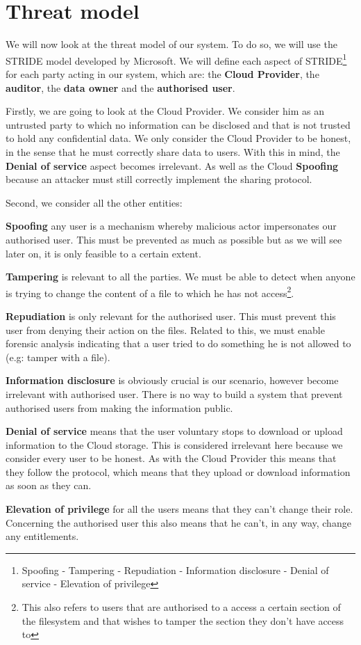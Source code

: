 \documentclass[../main.tex]{subfiles}
\begin{document}
\section{Threat model}
\label{section:problem:threat_model}

\par We will now look at the threat model of our system. To do so, we will use the STRIDE model developed by Microsoft. We will define each aspect of STRIDE\footnote{Spoofing - Tampering - Repudiation - Information disclosure - Denial of service - Elevation of privilege} for each party acting in our system, which are: the \textbf{Cloud Provider}, the \textbf{auditor}, the \textbf{data owner} and the \textbf{authorised user}.\\

\par Firstly, we are going to look at the Cloud Provider. We consider him as an untrusted party to which no information can be disclosed and that is not trusted to hold any confidential data. We only consider the Cloud Provider to be honest, in the sense that he must correctly share data to users. With this in mind, the \textbf{Denial of service} aspect becomes irrelevant. As well as the Cloud \textbf{Spoofing} because an attacker must still correctly implement the sharing protocol.\\

\par Second, we consider all the other entities:
\par \textbf{Spoofing} any user is a mechanism whereby malicious actor impersonates our authorised user. This must be prevented as much as possible but as we will see later on, it is only feasible to a certain extent.
\par \textbf{Tampering} is relevant to all the parties. We must be able to detect when anyone is trying to change the content of a file to which he has not access\footnote{This also refers to users that are authorised to a access a certain section of the filesystem and that wishes to tamper the section they don't have access to}.
\par \textbf{Repudiation} is only relevant for the authorised user. This must prevent this user from denying their action on the files. Related to this, we must enable forensic analysis indicating that a user tried to do something he is not allowed to (e.g: tamper with a file).
\par \textbf{Information disclosure} is obviously crucial is our scenario, however become irrelevant with authorised user. There is no way to build a system that prevent authorised users from making the information public.
\par \textbf{Denial of service} means that the user voluntary stops to download or upload information to the Cloud storage. This is considered irrelevant here because we consider every user to be honest. As with the Cloud Provider this means that they follow the protocol, which means that they upload or download information as soon as they can.
\par \textbf{Elevation of privilege} for all the users means that they can't change their role. Concerning the authorised user this also means that he can't, in any way, change any entitlements.
\end{document}
